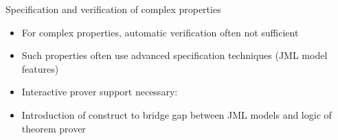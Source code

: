 \documentclass[final,nocolorBG,a4,mobius,nototal,pdf,slideColor]{prosper}
\begin{document}
\begin{slide}{Specification and verification of complex properties}
\begin{itemize}
\item For complex properties, automatic verification often not
sufficient 
\item Such properties often use advanced specification techniques
(JML model features)
\item Interactive prover support necessary: 
\item Introduction of  construct to bridge gap between
JML models and logic of theorem prover
\end{itemize}
\end{slide}



\end{document}
